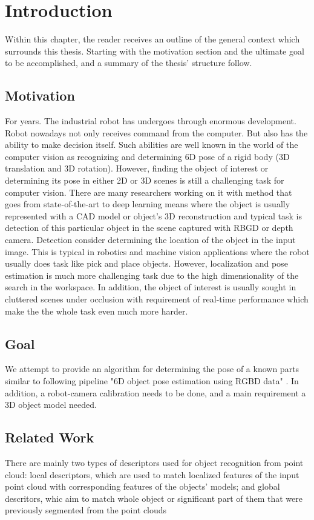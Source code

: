 \chapter{Introduction}
\label{chap:intro}

Within this chapter, the reader receives an outline of the general context which surrounds this thesis. Starting with the motivation section and the ultimate goal to be accomplished, and a summary of the thesis' structure follow. 

\section{Motivation}
For years. The industrial robot has undergoes through enormous development. Robot nowadays not only receives command from the computer. But also has the ability to make decision itself. Such abilities are well known in the world of the computer vision as recognizing and determining 6D pose of a rigid body (3D translation and 3D rotation). However, finding the object of interest or determining its pose in either 2D or 3D scenes is still a challenging task for computer vision. There are many researchers working on it with method that goes from state-of-the-art to deep learning means where the object is usually represented with a CAD model or object's 3D reconstruction and typical task is detection of this particular object in the scene captured with RBGD or depth camera. Detection consider determining the location of the object in the input image. This is typical in robotics and machine vision applications where the robot usually does task like pick and place objects. However, localization and pose estimation is much more challenging task due to the high dimensionality of the search in the workspace. In addition, the object of interest is usually sought in cluttered scenes under occlusion with requirement of real-time performance which make the the whole task even much more harder.

\section{Goal}
We attempt to provide an algorithm for determining the pose of a known parts similar to following pipeline "6D object pose estimation using RGBD data" \cite{intro2}. In addition, a robot-camera calibration needs to be done, and a main requirement a 3D object model needed.

\section{Related Work}
There are mainly two types of descriptors used for object recognition from point cloud: local descriptors, which are used to match localized features of the input point cloud with corresponding features of the objects' models; and global descritors, whic aim to match whole object or significant part of them that were previously segmented from the point clouds

